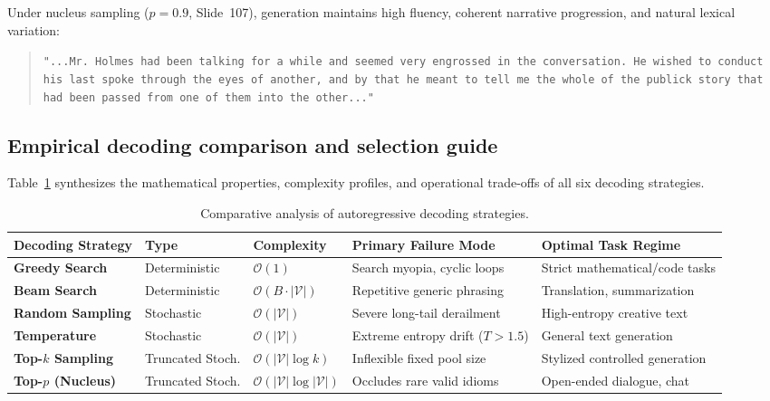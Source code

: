 \documentclass[../../../main.tex]{subfiles}
\begin{document}
Under nucleus sampling ($p=0.9$, Slide~107), generation maintains high fluency, coherent narrative progression, and natural lexical variation:
\begin{quote}
\texttt{"...Mr. Holmes had been talking for a while and seemed very engrossed in the conversation. He wished to conduct his last spoke through the eyes of another, and by that he meant to tell me the whole of the publick story that had been passed from one of them into the other..."}
\end{quote}


\subsection{Empirical decoding comparison and selection guide}
\label{subsec:empirical_decoding_synthesis}

Table~\ref{tab:decoding_strategies_comparison} synthesizes the mathematical properties, complexity profiles, and operational trade-offs of all six decoding strategies.

\begin{table}[t]
\centering
\caption{Comparative analysis of autoregressive decoding strategies.}
\label{tab:decoding_strategies_comparison}
\begin{tabularx}{\textwidth}{l p{2.2cm} p{2.0cm} p{3.2cm} X}
\toprule
\textbf{Decoding Strategy} & \textbf{Type} & \textbf{Complexity} & \textbf{Primary Failure Mode} & \textbf{Optimal Task Regime} \\
\midrule
\textbf{Greedy Search} & Deterministic & $\mathcal{O}(1)$ & Search myopia, cyclic loops & Strict mathematical/code tasks \\
\textbf{Beam Search} & Deterministic & $\mathcal{O}(B \cdot |\mathcal{V}|)$ & Repetitive generic phrasing & Translation, summarization \\
\textbf{Random Sampling} & Stochastic & $\mathcal{O}(|\mathcal{V}|)$ & Severe long-tail derailment & High-entropy creative text \\
\textbf{Temperature} & Stochastic & $\mathcal{O}(|\mathcal{V}|)$ & Extreme entropy drift ($T > 1.5$) & General text generation \\
\textbf{Top-$k$ Sampling} & Truncated Stoch. & $\mathcal{O}(|\mathcal{V}| \log k)$ & Inflexible fixed pool size & Stylized controlled generation \\
\textbf{Top-$p$ (Nucleus)} & Truncated Stoch. & $\mathcal{O}(|\mathcal{V}| \log |\mathcal{V}|)$ & Occludes rare valid idioms & Open-ended dialogue, chat \\
\bottomrule
\end{tabularx}
\end{table}
\end{document}
